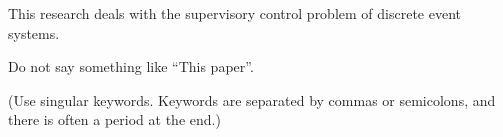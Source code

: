 This research deals with the supervisory control problem of discrete event systems.


Do not say something like ``This paper''.

(Use singular keywords. Keywords are separated by commas or semicolons, and there is often a period at the end.)